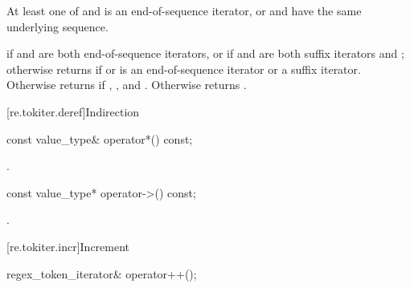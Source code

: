 \begin{itemdescr}
\pnum
\expects
At least one of  and  is an end-of-sequence iterator,
or  and  have the same underlying sequence.

\pnum
\returns
{} if  and  are both end-of-sequence iterators,
or if  and  are both suffix iterators and ;
otherwise returns  if  or  is an end-of-sequence
iterator or a suffix iterator. Otherwise returns  if ,
, and . Otherwise returns .
\end{itemdescr}

[re.tokiter.deref]{Indirection}

%
\begin{itemdecl}
const value_type& operator*() const;
\end{itemdecl}

\begin{itemdescr}
\pnum
\returns
{}.
\end{itemdescr}

%
\begin{itemdecl}
const value_type* operator->() const;
\end{itemdecl}

\begin{itemdescr}
\pnum
\returns
{}.
\end{itemdescr}


[re.tokiter.incr]{Increment}

%
\begin{itemdecl}
regex_token_iterator& operator++();
\end{itemdecl}

